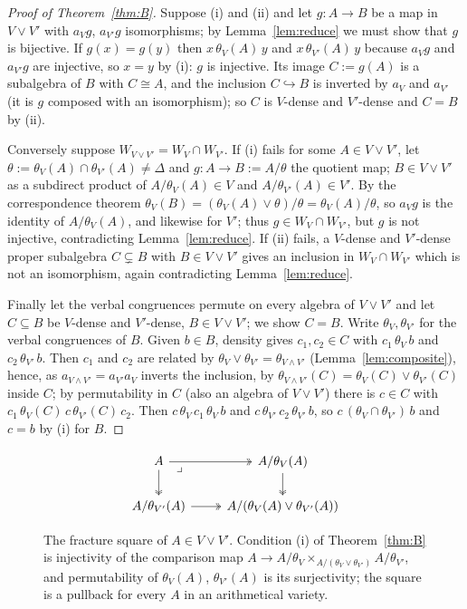 \documentclass[11pt]{amsart}
\theoremstyle{definition}
\begin{document}
\begin{proof}[Proof of Theorem~\ref{thm:B}]
Suppose (i) and (ii) and let $g\colon A\to B$ be a map in $V\vee V'$ with $a_Vg$,
$a_{V'}g$ isomorphisms; by Lemma~\ref{lem:reduce} we must show that $g$ is
bijective. If $g(x)=g(y)$ then $x\,\theta_V(A)\,y$ and $x\,\theta_{V'}(A)\,y$
because $a_Vg$ and $a_{V'}g$ are injective, so $x=y$ by (i): $g$ is injective.
Its image $C:=g(A)$ is a subalgebra of $B$ with $C\cong A$, and the inclusion
$C\hookrightarrow B$ is inverted by $a_V$ and $a_{V'}$ (it is $g$ composed with
an isomorphism); so $C$ is $V$-dense and $V'$-dense and $C=B$ by (ii).

Conversely suppose $W_{V\vee V'}=W_V\cap W_{V'}$. If (i) fails for some
$A\in V\vee V'$, let $\theta:=\theta_V(A)\cap\theta_{V'}(A)\ne\Delta$ and
$g\colon A\to B:=A/\theta$ the quotient map; $B\in V\vee V'$ as a subdirect
product of $A/\theta_V(A)\in V$ and $A/\theta_{V'}(A)\in V'$. By the
correspondence theorem $\theta_V(B)=(\theta_V(A)\vee\theta)/\theta
=\theta_V(A)/\theta$, so $a_Vg$ is the identity of $A/\theta_V(A)$, and likewise
for $V'$; thus $g\in W_V\cap W_{V'}$, but $g$ is not injective, contradicting
Lemma~\ref{lem:reduce}. If (ii) fails, a $V$-dense and $V'$-dense proper
subalgebra $C\subsetneq B$ with $B\in V\vee V'$ gives an inclusion in
$W_V\cap W_{V'}$ which is not an isomorphism, again contradicting
Lemma~\ref{lem:reduce}.

Finally let the verbal congruences permute on every algebra of $V\vee V'$ and
let $C\subseteq B$ be $V$-dense and $V'$-dense, $B\in V\vee V'$; we show $C=B$.
Write $\theta_V,\theta_{V'}$ for the verbal congruences of $B$. Given $b\in B$,
density gives $c_1,c_2\in C$ with $c_1\,\theta_V\,b$ and $c_2\,\theta_{V'}\,b$.
Then $c_1$ and $c_2$ are related by $\theta_V\vee\theta_{V'}=\theta_{V\wedge V'}$
(Lemma~\ref{lem:composite}), hence, as $a_{V\wedge V'}=a_{V'}a_V$ inverts the
inclusion, by $\theta_{V\wedge V'}(C)=\theta_V(C)\vee\theta_{V'}(C)$ inside $C$;
by permutability in $C$ (also an algebra of $V\vee V'$) there is $c\in C$ with
$c_1\,\theta_V(C)\,c\,\theta_{V'}(C)\,c_2$. Then $c\,\theta_V\,c_1\,\theta_V\,b$
and $c\,\theta_{V'}\,c_2\,\theta_{V'}\,b$, so $c\,(\theta_V\cap\theta_{V'})\,b$
and $c=b$ by (i) for $B$.
\end{proof}

\begin{figure}[ht]
\[
\begin{tikzcd}
A\arrow[r,two heads]\arrow[d,two heads]\arrow[dr,phantom,"\lrcorner",very near start] & A/\theta_V(A)\arrow[d,two heads]\\
A/\theta_{V'}(A)\arrow[r,two heads] & A/(\theta_V(A)\vee\theta_{V'}(A))
\end{tikzcd}
\]
\caption{The fracture square of $A\in V\vee V'$. Condition (i) of Theorem~\ref{thm:B}
is injectivity of the comparison map
$A\to A/\theta_V\times_{A/(\theta_V\vee\theta_{V'})}A/\theta_{V'}$, and
permutability of $\theta_V(A)$, $\theta_{V'}(A)$ is its surjectivity; the
square is a pullback for every $A$ in an arithmetical variety.}
\label{fig:fracture}
\end{figure}
\end{document}
